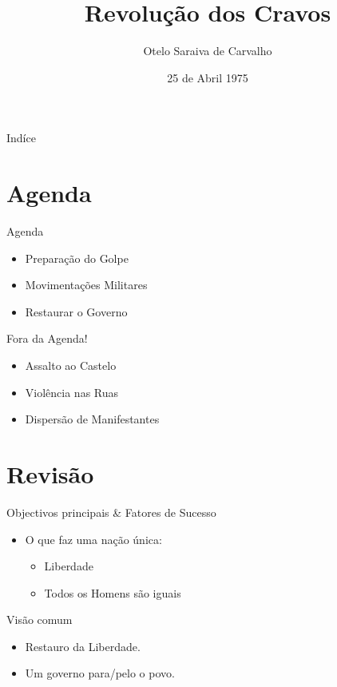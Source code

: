 \documentclass{beamer}
\title{Revolução dos Cravos}
\author{Otelo Saraiva de Carvalho}
\institute{Portugal}
\date{25 de Abril 1975}
\begin{document}
\begin{frame}
  \titlepage
\end{frame}



\begin{frame}{Indíce}
  \tableofcontents
\end{frame}

\section{Agenda}

\begin{frame}{Agenda}

\begin{itemize}
  \item Preparação do Golpe 
  \item Movimentações Militares
  \item Restaurar o Governo
\end{itemize}

\end{frame}

\begin{frame}{Fora da Agenda!}

\begin{itemize}[<+->]
  \item Assalto ao Castelo
  \item Violência nas Ruas
  \item Dispersão de Manifestantes
\end{itemize}

\end{frame}

\section{Revisão}

\begin{frame}{Objectivos principais \& Fatores de Sucesso}

\begin{itemize}
\item O que faz uma nação única:
  \begin{itemize}
    \item Liberdade
    \item Todos os Homens são iguais
  \end{itemize}
\end{itemize}

\begin{block}{Visão comum}
\begin{itemize}
\item Restauro da Liberdade.
\item Um governo para/pelo o povo.
\end{itemize}
\end{block}

\end{frame}
\end{document}
